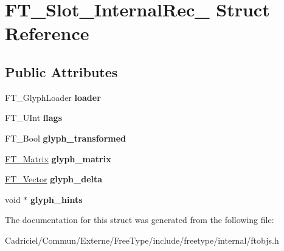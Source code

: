 \hypertarget{struct_f_t___slot___internal_rec__}{\section{F\-T\-\_\-\-Slot\-\_\-\-Internal\-Rec\-\_\- Struct Reference}
\label{struct_f_t___slot___internal_rec__}
}
\subsection*{Public Attributes}
\begin{DoxyCompactItemize}
\item 
\hypertarget{struct_f_t___slot___internal_rec___ac57f8c939f667938ab9f986088c15d8f}{F\-T\-\_\-\-Glyph\-Loader {\bfseries loader}}\label{struct_f_t___slot___internal_rec___ac57f8c939f667938ab9f986088c15d8f}

\item 
\hypertarget{struct_f_t___slot___internal_rec___a9a2a287ba2b363197b36fe24d2f48746}{F\-T\-\_\-\-U\-Int {\bfseries flags}}\label{struct_f_t___slot___internal_rec___a9a2a287ba2b363197b36fe24d2f48746}

\item 
\hypertarget{struct_f_t___slot___internal_rec___ac2bba891ac70016b74c085a05c1f182c}{F\-T\-\_\-\-Bool {\bfseries glyph\-\_\-transformed}}\label{struct_f_t___slot___internal_rec___ac2bba891ac70016b74c085a05c1f182c}

\item 
\hypertarget{struct_f_t___slot___internal_rec___a95af217daf1c2080692b5a69e345aa3b}{\hyperlink{struct_f_t___matrix__}{F\-T\-\_\-\-Matrix} {\bfseries glyph\-\_\-matrix}}\label{struct_f_t___slot___internal_rec___a95af217daf1c2080692b5a69e345aa3b}

\item 
\hypertarget{struct_f_t___slot___internal_rec___a2a94b955dd1e260aaf8699238d44769d}{\hyperlink{struct_f_t___vector__}{F\-T\-\_\-\-Vector} {\bfseries glyph\-\_\-delta}}\label{struct_f_t___slot___internal_rec___a2a94b955dd1e260aaf8699238d44769d}

\item 
\hypertarget{struct_f_t___slot___internal_rec___a16337853823cdccfb0c636673c4eb3ae}{void $\ast$ {\bfseries glyph\-\_\-hints}}\label{struct_f_t___slot___internal_rec___a16337853823cdccfb0c636673c4eb3ae}

\end{DoxyCompactItemize}


The documentation for this struct was generated from the following file\-:\begin{DoxyCompactItemize}
\item 
Cadriciel/\-Commun/\-Externe/\-Free\-Type/include/freetype/internal/ftobjs.\-h\end{DoxyCompactItemize}
